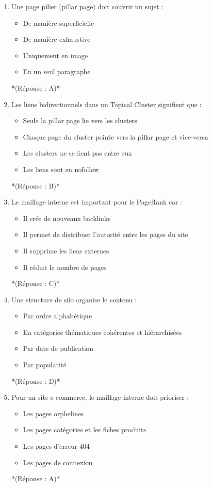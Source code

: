 \documentclass[12pt,a4paper,twoside]{report}
\begin{document}
\begin{enumerate}
\item Une page pilier (pillar page) doit couvrir un sujet :
\begin{itemize}
\item[A)] De manière superficielle
\item[B)] De manière exhaustive
\item[C)] Uniquement en image
\item[D)] En un seul paragraphe
\end{itemize}
*(Réponse : A)*

\item Les liens bidirectionnels dans un Topical Cluster signifient que :
\begin{itemize}
\item[A)] Seule la pillar page lie vers les clusters
\item[B)] Chaque page du cluster pointe vers la pillar page et vice-versa
\item[C)] Les clusters ne se lient pas entre eux
\item[D)] Les liens sont en nofollow
\end{itemize}
*(Réponse : B)*

\item Le maillage interne est important pour le PageRank car :
\begin{itemize}
\item[A)] Il crée de nouveaux backlinks
\item[B)] Il permet de distribuer l'autorité entre les pages du site
\item[C)] Il supprime les liens externes
\item[D)] Il réduit le nombre de pages
\end{itemize}
*(Réponse : C)*

\item Une structure de silo organise le contenu :
\begin{itemize}
\item[A)] Par ordre alphabétique
\item[B)] En catégories thématiques cohérentes et hiérarchisées
\item[C)] Par date de publication
\item[D)] Par popularité
\end{itemize}
*(Réponse : D)*

\item Pour un site e-commerce, le maillage interne doit prioriser :
\begin{itemize}
\item[A)] Les pages orphelines
\item[B)] Les pages catégories et les fiches produits
\item[C)] Les pages d'erreur 404
\item[D)] Les pages de connexion
\end{itemize}
*(Réponse : A)*


\end{enumerate}
\end{document}
